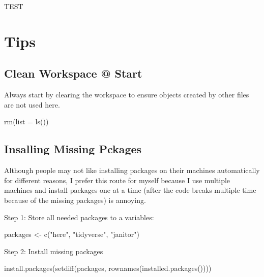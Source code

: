 \documentclass[
  letterpaper,
  DIV=11,
  numbers=noendperiod]{scrreprt}
\newenvironment{Shaded}{\begin{snugshade}}{\end{snugshade}}
\newcommand{\AttributeTok}[1]{\textcolor[rgb]{0.40,0.45,0.13}{#1}}
\newcommand{\FunctionTok}[1]{\textcolor[rgb]{0.28,0.35,0.67}{#1}}
\newcommand{\NormalTok}[1]{\textcolor[rgb]{0.00,0.23,0.31}{#1}}
\newcommand{\OtherTok}[1]{\textcolor[rgb]{0.00,0.23,0.31}{#1}}
\newcommand{\StringTok}[1]{\textcolor[rgb]{0.13,0.47,0.30}{#1}}
\begin{document}
TEST

\chapter{Tips}\label{tips}

\section{Clean Workspace @ Start}\label{clean-workspace-start}

Always start by clearing the workspace to ensure objects created by
other files are not used here.

\begin{Shaded}
\begin{Highlighting}[]
\FunctionTok{rm}\NormalTok{(}\AttributeTok{list =} \FunctionTok{ls}\NormalTok{())}
\end{Highlighting}
\end{Shaded}

\section{Insalling Missing Pckages}\label{insalling-missing-pckages}

Although people may not like installing packages on their machines
automatically for different reasons, I prefer this route for myself
because I use multiple machines and install packages one at a time
(after the code breaks multiple time because of the missing packages) is
annoying.

Step 1: Store all needed packages to a variables:

\begin{Shaded}
\begin{Highlighting}[]
\NormalTok{packages }\OtherTok{\textless{}{-}} \FunctionTok{c}\NormalTok{(}\StringTok{"here"}\NormalTok{, }\StringTok{"tidyverse"}\NormalTok{, }\StringTok{"janitor"}\NormalTok{)}
\end{Highlighting}
\end{Shaded}

Step 2: Install missing packages

\begin{Shaded}
\begin{Highlighting}[]
\FunctionTok{install.packages}\NormalTok{(}\FunctionTok{setdiff}\NormalTok{(packages, }\FunctionTok{rownames}\NormalTok{(}\FunctionTok{installed.packages}\NormalTok{())))}
\end{Highlighting}
\end{Shaded}
\end{document}

